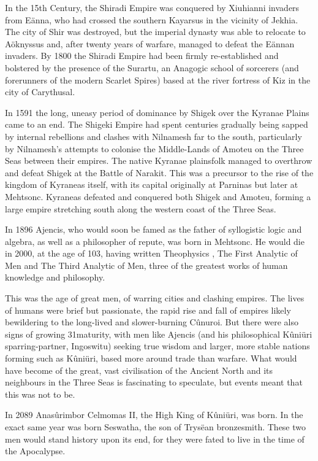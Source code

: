 \documentclass[]{book}
\begin{document}
In the 15th Century, the Shiradi Empire was conquered by Xiuhianni invaders from
Eänna, who had crossed the southern Kayarsus in the vicinity of Jekhia. The city of Shir
was destroyed, but the imperial dynasty was able to relocate to Aöknyssus and, after
twenty years of warfare, managed to defeat the Eännan invaders. By 1800 the Shiradi
Empire had been firmly re-established and bolstered by the presence of the Surartu, an
Anagogic school of sorcerers (and forerunners of the modern Scarlet Spires) based at
the river fortress of Kiz in the city of Carythusal.

In 1591 the long, uneasy period of dominance by Shigek over the Kyranae Plains came
to an end. The Shigeki Empire had spent centuries gradually being sapped by internal
rebellions and clashes with Nilnamesh far to the south, particularly by Nilnamesh's
attempts to colonise the Middle-Lands of Amoteu on the Three Seas between their
empires. The native Kyranae plainsfolk managed to overthrow and defeat Shigek at the
Battle of Narakit. This was a precursor to the rise of the kingdom of Kyraneas itself,
with its capital originally at Parninas but later at Mehtsonc. Kyraneas defeated and
conquered both Shigek and Amoteu, forming a large empire stretching south along the
western coast of the Three Seas.

In 1896 Ajencis, who would soon be famed as the father of syllogistic logic and algebra,
as well as a philosopher of repute, was born in Mehtsonc. He would die in 2000, at the
age of 103, having written Theophysics , The First Analytic of Men and The Third
Analytic of Men, three of the greatest works of human knowledge and philosophy.

This was the age of great men, of warring cities and clashing empires. The lives of
humans were brief but passionate, the rapid rise and fall of empires likely bewildering
to the long-lived and slower-burning Cûnuroi. But there were also signs of growing
31maturity, with men like Ajencis (and his philosophical Kûniüri sparring-partner,
Ingoswitu) seeking true wisdom and larger, more stable nations forming such as
Kûniüri, based more around trade than warfare. What would have become of the great,
vast civilisation of the Ancient North and its neighbours in the Three Seas is fascinating
to speculate, but events meant that this was not to be.

In 2089 Anasûrimbor Celmomas II, the High King of Kûniüri, was born. In the exact
same year was born Seswatha, the son of Trysëan bronzesmith. These two men would
stand history upon its end, for they were fated to live in the time of the Apocalypse.
\end{document}
